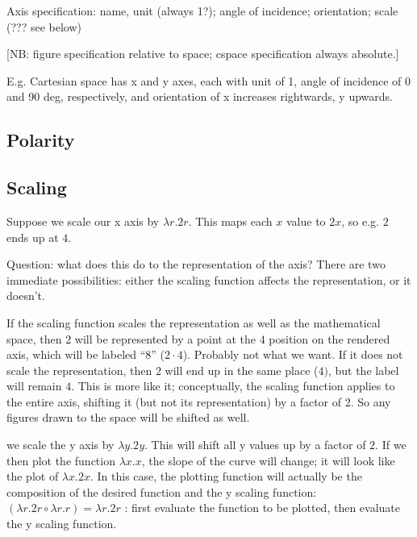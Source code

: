 \documentclass[reqno,12pt]{tufte-handout}
\numberwithin{equation}{subsection}
\numberwithin{equation}{subsection}
\begin{document}
Axis specification:  name, unit (always 1?); angle of incidence; orientation; scale (??? see below)

[NB: figure specification relative to space; cspace specification always absolute.]

E.g. Cartesian space has x and y axes, each with unit of 1, angle of
incidence of 0 and 90 deg, respectively, and orientation of x
increases rightwards, y upwards.

\subsection{Polarity}
\label{subs:polarity}

\subsection{Scaling}
\label{subs:scaling}

Suppose we scale our x axis by \(\lambda r.2r\).  This maps each \(x\)
value to \(2x\), so e.g. \(2\) ends up at \(4\).

Question: what does this do to the representation of the axis?  There
are two immediate possibilities: either the scaling function affects
the representation, or it doesn't.

If the scaling function scales the representation as well as the
mathematical space, then \(2\) will be represented by a point at the \(4\)
position on the rendered axis, which will be labeled ``8'' (\(2\cdot
4\)).  Probably not what we want.  If it does not scale the
representation, then \(2\) will end up in the same place (\(4)\), but
the label will remain \(4\).  This is more like it; conceptually, the
scaling function applies to the entire axis, shifting it (but not its
representation) by a factor of 2.  So any figures drawn to the space
will be shifted as well.

 we scale the y axis by \(\lambda y.2y\).
This will shift all y values up by a factor of \(2\).  If we then plot
the function \(\lambda x.x\), the slope of the curve will change; it
will look like the plot of \(\lambda x.2x\).  In this case, the
plotting function will actually be the composition of the desired
function and the y scaling function: \((\lambda r.2r\circ\lambda r.r)
= \lambda r.2r\)%
: first evaluate the function to be plotted, then
evaluate the y scaling function.
\end{document}
